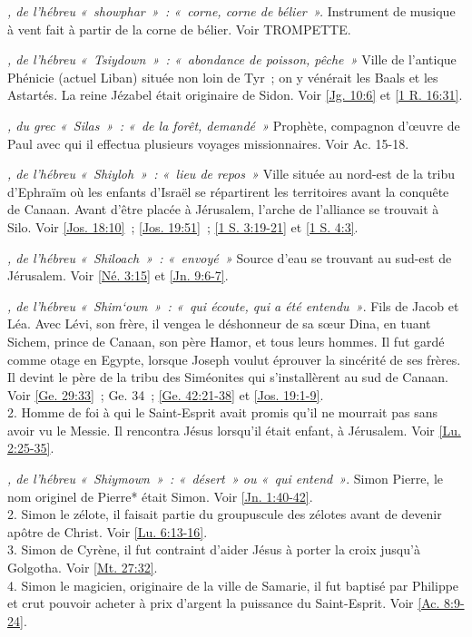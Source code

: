 \begin{multicols}{2}
\textit{, de l'hébreu «~showphar~»~: «~corne, corne de bélier~».}\newline
Instrument de musique à vent fait à partir de la corne de bélier. Voir TROMPETTE.

\textit{, de l'hébreu «~Tsiydown~»~: «~abondance de poisson, pêche~»}\newline
Ville de l'antique Phénicie (actuel Liban) située non loin de Tyr~; on y vénérait les Baals et les Astartés. La reine Jézabel était originaire de Sidon. Voir \vref{Jg. 10:6} et \vref{1 R. 16:31}.

\textit{, du grec «~Silas~»~: «~de la forêt, demandé~»}\newline
Prophète, compagnon d'œuvre de Paul avec qui il effectua plusieurs voyages missionnaires. Voir Ac. 15-18.

\textit{, de l'hébreu «~Shiyloh~»~: «~lieu de repos~»}\newline
Ville située au nord-est de la tribu d'Ephraïm où les enfants d'Israël se répartirent les territoires avant la conquête de Canaan. Avant d'être placée à Jérusalem, l'arche de l'alliance se trouvait à Silo. Voir \vref{Jos. 18:10}~; \vref{Jos. 19:51}~; \vref{1 S. 3:19-21} et \vref{1 S. 4:3}.

\textit{, de l'hébreu «~Shiloach~»~: «~envoyé~»}\newline
Source d'eau se trouvant au sud-est de Jérusalem. Voir \vref{Né. 3:15} et \vref{Jn. 9:6-7}.

\textit{, de l'hébreu «~Shim`own~»~: «~qui écoute, qui a été entendu~»}. Fils de Jacob et Léa. Avec Lévi, son frère, il vengea le déshonneur de sa sœur Dina, en tuant Sichem, prince de Canaan, son père Hamor, et tous leurs hommes. Il fut gardé comme otage en Egypte, lorsque Joseph voulut éprouver la sincérité de ses frères. Il devint le père de la tribu des Siméonites qui s'installèrent au sud de Canaan. Voir \vref{Ge. 29:33}~; Ge. 34~; \vref{Ge. 42:21-38} et \vref{Jos. 19:1-9}.
\\2. Homme de foi à qui le Saint-Esprit avait promis qu'il ne mourrait pas sans avoir vu le Messie. Il rencontra Jésus lorsqu'il était enfant, à Jérusalem. Voir \vref{Lu. 2:25-35}.

\textit{, de l'hébreu «~Shiymown~»~: «~désert~» ou «~qui entend~»}. Simon Pierre, le nom originel de Pierre* était Simon. Voir \vref{Jn. 1:40-42}.
\\2. Simon le zélote, il faisait partie du groupuscule des zélotes avant de devenir apôtre de Christ. Voir \vref{Lu. 6:13-16}.
\\3. Simon de Cyrène, il fut contraint d'aider Jésus à porter la croix jusqu'à Golgotha. Voir \vref{Mt. 27:32}.
\\4. Simon le magicien, originaire de la ville de Samarie, il fut baptisé par Philippe et crut pouvoir acheter à prix d'argent la puissance du Saint-Esprit. Voir \vref{Ac. 8:9-24}.


\end{multicols}
